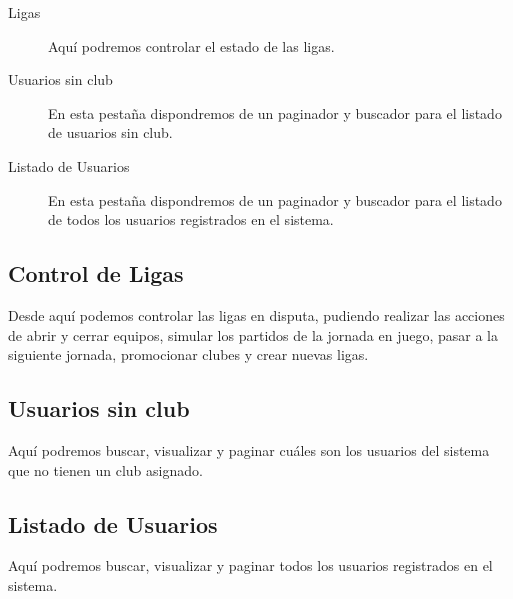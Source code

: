 
\begin{description}
\item[Ligas] Aquí podremos controlar el estado de las ligas.
\item[Usuarios sin club] En esta pestaña dispondremos de un paginador y buscador
  para el listado de usuarios sin club.
\item[Listado de Usuarios] En esta pestaña dispondremos de un paginador y buscador
  para el listado de todos los usuarios registrados en el sistema.
\end{description}

\subsection{Control de Ligas}
Desde aquí podemos controlar las ligas en disputa, pudiendo realizar las
acciones de abrir y cerrar equipos, simular los partidos de la jornada en juego,
pasar a la siguiente jornada, promocionar clubes y crear nuevas ligas.

\subsection{Usuarios sin club}
Aquí podremos buscar, visualizar y paginar cuáles son los usuarios del sistema
que no tienen un club asignado.
\subsection{Listado de Usuarios}
Aquí podremos buscar, visualizar y paginar todos los usuarios registrados en el
sistema.  
